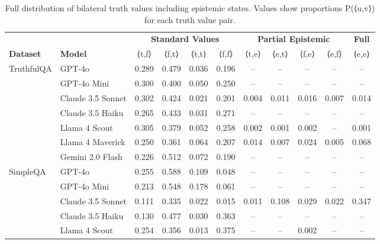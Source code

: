 \begin{table}[htbp]
\centering
\caption{Full distribution of bilateral truth values including epistemic states. Values show proportions P(⟨u,v⟩) for each truth value pair.}
\small
\begin{tabular}{ll|cccc|cccc|c}
\toprule
 & & \multicolumn{4}{c|}{\textbf{Standard Values}} & \multicolumn{4}{c|}{\textbf{Partial Epistemic}} & \textbf{Full} \\
\textbf{Dataset} & \textbf{Model} & ⟨t,f⟩ & ⟨f,t⟩ & ⟨t,t⟩ & ⟨f,f⟩ & ⟨t,e⟩ & ⟨e,t⟩ & ⟨f,e⟩ & ⟨e,f⟩ & ⟨e,e⟩ \\
\midrule
\multirow{7}{*}{TruthfulQA}
 & GPT-4o & 0.289 & 0.479 & 0.036 & 0.196 & -- & -- & -- & -- & -- \\
 
 & GPT-4o Mini & 0.300 & 0.400 & 0.050 & 0.250 & -- & -- & -- & -- & -- \\
 
 & Claude 3.5 Sonnet & 0.302 & 0.424 & 0.021 & 0.201 & 0.004 & 0.011 & 0.016 & 0.007 & 0.014 \\
 
 & Claude 3.5 Haiku & 0.265 & 0.433 & 0.031 & 0.271 & -- & -- & -- & -- & -- \\
 
 & Llama 4 Scout & 0.305 & 0.379 & 0.052 & 0.258 & 0.002 & 0.001 & 0.002 & -- & 0.001 \\
 
 & Llama 4 Maverick & 0.250 & 0.361 & 0.064 & 0.207 & 0.014 & 0.007 & 0.024 & 0.005 & 0.068 \\
 
 & Gemini 2.0 Flash & 0.226 & 0.512 & 0.072 & 0.190 & -- & -- & -- & -- & -- \\
\cline{1-11}
\multirow{7}{*}{SimpleQA}
 & GPT-4o & 0.255 & 0.588 & 0.109 & 0.048 & -- & -- & -- & -- & -- \\
 
 & GPT-4o Mini & 0.213 & 0.548 & 0.178 & 0.061 & -- & -- & -- & -- & -- \\
 
 & Claude 3.5 Sonnet & 0.111 & 0.335 & 0.022 & 0.015 & 0.011 & 0.108 & 0.029 & 0.022 & 0.347 \\
 
 & Claude 3.5 Haiku & 0.130 & 0.477 & 0.030 & 0.363 & -- & -- & -- & -- & -- \\
 
 & Llama 4 Scout & 0.254 & 0.356 & 0.013 & 0.375 & -- & -- & 0.002 & -- & -- \\
 

\end{tabular}
\end{table}
